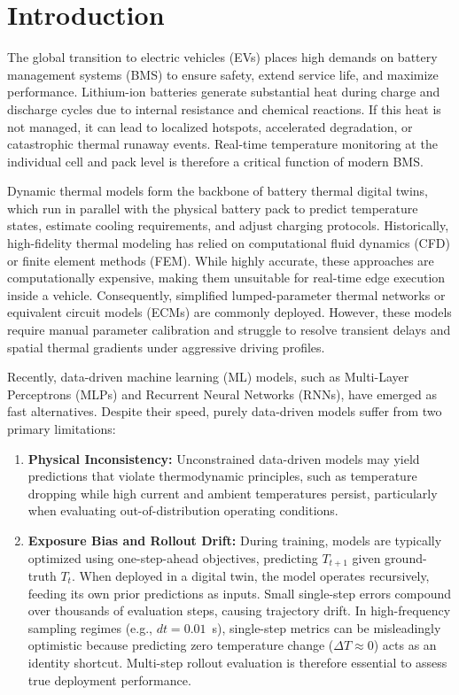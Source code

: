 \section{Introduction}

The global transition to electric vehicles (EVs) places high demands on battery management systems (BMS) to ensure safety, extend service life, and maximize performance. Lithium-ion batteries generate substantial heat during charge and discharge cycles due to internal resistance and chemical reactions. If this heat is not managed, it can lead to localized hotspots, accelerated degradation, or catastrophic thermal runaway events. Real-time temperature monitoring at the individual cell and pack level is therefore a critical function of modern BMS.

Dynamic thermal models form the backbone of battery thermal digital twins, which run in parallel with the physical battery pack to predict temperature states, estimate cooling requirements, and adjust charging protocols. Historically, high-fidelity thermal modeling has relied on computational fluid dynamics (CFD) or finite element methods (FEM). While highly accurate, these approaches are computationally expensive, making them unsuitable for real-time edge execution inside a vehicle. Consequently, simplified lumped-parameter thermal networks or equivalent circuit models (ECMs) are commonly deployed. However, these models require manual parameter calibration and struggle to resolve transient delays and spatial thermal gradients under aggressive driving profiles.

Recently, data-driven machine learning (ML) models, such as Multi-Layer Perceptrons (MLPs) and Recurrent Neural Networks (RNNs), have emerged as fast alternatives. Despite their speed, purely data-driven models suffer from two primary limitations:
\begin{enumerate}
    \item \textbf{Physical Inconsistency:} Unconstrained data-driven models may yield predictions that violate thermodynamic principles, such as temperature dropping while high current and ambient temperatures persist, particularly when evaluating out-of-distribution operating conditions.
    \item \textbf{Exposure Bias and Rollout Drift:} During training, models are typically optimized using one-step-ahead objectives, predicting $T_{t+1}$ given ground-truth $T_t$. When deployed in a digital twin, the model operates recursively, feeding its own prior predictions as inputs. Small single-step errors compound over thousands of evaluation steps, causing trajectory drift. In high-frequency sampling regimes (e.g., $dt = 0.01$~s), single-step metrics can be misleadingly optimistic because predicting zero temperature change ($\Delta T \approx 0$) acts as an identity shortcut. Multi-step rollout evaluation is therefore essential to assess true deployment performance.
\end{enumerate}

